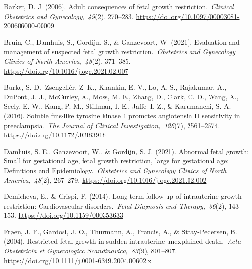 \documentclass[authordate, reflection,issue]{jote-new-article}
\begin{document}
	Barker, D. J. (2006). Adult consequences of fetal growth restriction. \emph{Clinical Obstetrics and Gynecology, 49}(2), 270--283. \url{https://doi.org/10.1097/00003081-200606000-00009}







	Bruin, C., Damhuis, S., Gordijn, S., \& Ganzevoort, W. (2021). Evaluation and management of suspected fetal growth restriction. \emph{Obstetrics and Gynecology Clinics of North America, 48}(2), 371--385. \url{https://doi.org/10.1016/j.ogc.2021.02.007}







	Burke, S. D., Zsengellér, Z. K., Khankin, E. V., Lo, A. S., Rajakumar, A., DuPont, J. J., McCurley, A., Moss, M. E., Zhang, D., Clark, C. D., Wang, A., Seely, E. W., Kang, P. M., Stillman, I. E., Jaffe, I. Z., \& Karumanchi, S. A. (2016). Soluble fms-like tyrosine kinase 1 promotes angiotensin II sensitivity in preeclampsia. \emph{The Journal of Clinical Investigation, 126}(7), 2561--2574. \url{https://doi.org/10.1172/JCI83918}







	Damhuis, S. E., Ganzevoort, W., \& Gordijn, S. J. (2021). Abnormal fetal growth: Small for gestational age, fetal growth restriction, large for gestational age: Definitions and Epidemiology. \emph{Obstetrics and Gynecology Clinics of North America}, \emph{48}(2), 267--279. \url{https://doi.org/10.1016/j.ogc.2021.02.002}







	Demicheva, E., \& Crispi, F. (2014). Long-term follow-up of intrauterine growth restriction: Cardiovascular disorders. \emph{Fetal Diagnosis and Therapy, 36}(2), 143--153. \url{https://doi.org/10.1159/000353633}







	Frøen, J. F., Gardosi, J. O., Thurmann, A., Francis, A., \& Stray-Pedersen, B. (2004). Restricted fetal growth in sudden intrauterine unexplained death. \emph{Acta Obstetricia et Gynecologica Scandinavica, 83}(9), 801--807. \url{https://doi.org/10.1111/j.0001-6349.2004.00602.x}
\end{document}
